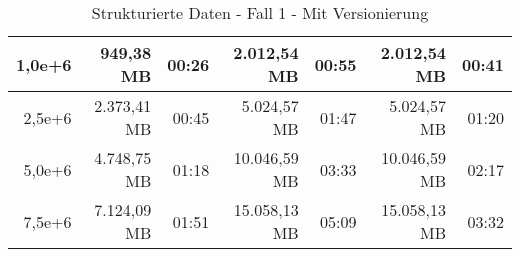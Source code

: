 \begin{table}
\begin{tabular}{|r|r|r|r|r|r|r|}
        1,0e+6          & 949,38 MB           & 00:26           & 2.012,54 MB         & 00:55           & 2.012,54 MB         & 00:41           \\ \hline
        2,5e+6          & 2.373,41 MB         & 00:45           & 5.024,57 MB         & 01:47           & 5.024,57 MB         & 01:20           \\ \hline
        5,0e+6          & 4.748,75 MB         & 01:18           & 10.046,59 MB        & 03:33           & 10.046,59 MB        & 02:17           \\ \hline
        7,5e+6          & 7.124,09 MB         & 01:51           & 15.058,13 MB        & 05:09           & 15.058,13 MB        & 03:32           \\ \hline
    \end{tabular}
    \caption{Strukturierte Daten - Fall 1 - Mit Versionierung}
\end{table}

